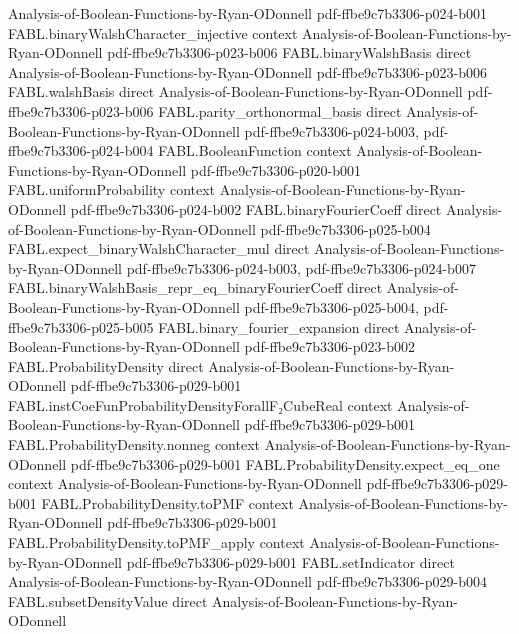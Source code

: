 \begin{theorem}
  {Analysis-of-Boolean-Functions-by-Ryan-ODonnell}
  {pdf-ffbe9c7b3306-p024-b001}
\proofstep
  {FABL.binaryWalshCharacter_injective}
  {context}
  {Analysis-of-Boolean-Functions-by-Ryan-ODonnell}
  {pdf-ffbe9c7b3306-p023-b006}
\proofstep
  {FABL.binaryWalshBasis}
  {direct}
  {Analysis-of-Boolean-Functions-by-Ryan-ODonnell}
  {pdf-ffbe9c7b3306-p023-b006}
\proofstep
  {FABL.walshBasis}
  {direct}
  {Analysis-of-Boolean-Functions-by-Ryan-ODonnell}
  {pdf-ffbe9c7b3306-p023-b006}
\proofstep
  {FABL.parity_orthonormal_basis}
  {direct}
  {Analysis-of-Boolean-Functions-by-Ryan-ODonnell}
  {pdf-ffbe9c7b3306-p024-b003,
    pdf-ffbe9c7b3306-p024-b004}
\proofstep
  {FABL.BooleanFunction}
  {context}
  {Analysis-of-Boolean-Functions-by-Ryan-ODonnell}
  {pdf-ffbe9c7b3306-p020-b001}
\proofstep
  {FABL.uniformProbability}
  {context}
  {Analysis-of-Boolean-Functions-by-Ryan-ODonnell}
  {pdf-ffbe9c7b3306-p024-b002}
\proofstep
  {FABL.binaryFourierCoeff}
  {direct}
  {Analysis-of-Boolean-Functions-by-Ryan-ODonnell}
  {pdf-ffbe9c7b3306-p025-b004}
\proofstep
  {FABL.expect_binaryWalshCharacter_mul}
  {direct}
  {Analysis-of-Boolean-Functions-by-Ryan-ODonnell}
  {pdf-ffbe9c7b3306-p024-b003,
    pdf-ffbe9c7b3306-p024-b007}
\proofstep
  {FABL.binaryWalshBasis_repr_eq_binaryFourierCoeff}
  {direct}
  {Analysis-of-Boolean-Functions-by-Ryan-ODonnell}
  {pdf-ffbe9c7b3306-p025-b004,
    pdf-ffbe9c7b3306-p025-b005}
\proofstep
  {FABL.binary_fourier_expansion}
  {direct}
  {Analysis-of-Boolean-Functions-by-Ryan-ODonnell}
  {pdf-ffbe9c7b3306-p023-b002}
\proofstep
  {FABL.ProbabilityDensity}
  {direct}
  {Analysis-of-Boolean-Functions-by-Ryan-ODonnell}
  {pdf-ffbe9c7b3306-p029-b001}
\proofstep
  {FABL.instCoeFunProbabilityDensityForallF₂CubeReal}
  {context}
  {Analysis-of-Boolean-Functions-by-Ryan-ODonnell}
  {pdf-ffbe9c7b3306-p029-b001}
\proofstep
  {FABL.ProbabilityDensity.nonneg}
  {context}
  {Analysis-of-Boolean-Functions-by-Ryan-ODonnell}
  {pdf-ffbe9c7b3306-p029-b001}
\proofstep
  {FABL.ProbabilityDensity.expect_eq_one}
  {context}
  {Analysis-of-Boolean-Functions-by-Ryan-ODonnell}
  {pdf-ffbe9c7b3306-p029-b001}
\proofstep
  {FABL.ProbabilityDensity.toPMF}
  {context}
  {Analysis-of-Boolean-Functions-by-Ryan-ODonnell}
  {pdf-ffbe9c7b3306-p029-b001}
\proofstep
  {FABL.ProbabilityDensity.toPMF_apply}
  {context}
  {Analysis-of-Boolean-Functions-by-Ryan-ODonnell}
  {pdf-ffbe9c7b3306-p029-b001}
\proofstep
  {FABL.setIndicator}
  {direct}
  {Analysis-of-Boolean-Functions-by-Ryan-ODonnell}
  {pdf-ffbe9c7b3306-p029-b004}
\proofstep
  {FABL.subsetDensityValue}
  {direct}
  {Analysis-of-Boolean-Functions-by-Ryan-ODonnell}

\end{theorem}
